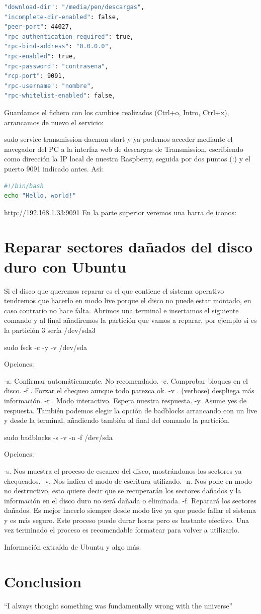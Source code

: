 \documentclass{article}
\begin{document}
\begin{lstlisting}[language=bash]
"download-dir": "/media/pen/descargas", 
"incomplete-dir-enabled": false, 
"peer-port": 44027, 
"rpc-authentication-required": true, 
"rpc-bind-address": "0.0.0.0", 
"rpc-enabled": true, 
"rpc-password": "contrasena", 
"rcp-port": 9091, 
"rpc-username": "nombre", 
"rpc-whitelist-enabled": false,
\end{lstlisting}

Guardamos el fichero con los cambios realizados (Ctrl+o, Intro, Ctrl+x), arrancamos de nuevo el servicio:

sudo service transmission-daemon start
y ya podemos acceder mediante el navegador del PC a la interfaz web de descargas de Transmission, escribiendo como dirección la IP local de nuestra Raspberry, seguida por dos puntos (:) y el puerto 9091 indicado antes. Así:

\begin{lstlisting}[language=bash,caption={bash version}]
#!/bin/bash
echo "Hello, world!"
\end{lstlisting}

http://192.168.1.33:9091
En la parte superior veremos una barra de iconos:

\section{Reparar sectores dañados del disco duro con Ubuntu}

Si el disco que queremos reparar es el que contiene el sistema operativo tendremos que hacerlo en modo live porque el disco no puede estar montado, en caso contrario no hace falta. Abrimos una terminal e insertamos el siguiente comando y al final añadiremos la partición que vamos a reparar, por ejemplo si es la partición 3 sería /dev/sda3

sudo fsck -c -y -v /dev/sda

Opciones:

-a. Confirmar automáticamente. No recomendado.
-c. Comprobar bloques en el disco.
-f . Forzar el chequeo aunque todo parezca ok.
-v . (verbose) despliega más información.
-r . Modo interactivo. Espera nuestra respuesta.
-y. Asume yes de respuesta.
También podemos elegir la opción de badblocks arrancando con un live y desde la terminal, añadiendo también al final del comando la partición.

sudo badblocks -s -v -n -f /dev/sda

Opciones:

-s. Nos muestra el proceso de escaneo del disco, mostrándonos los sectores ya chequeados.
-v. Nos indica el modo de escritura utilizado.
-n. Nos pone en modo no destructivo, esto quiere decir que se recuperarán los sectores dañados y la información en el disco duro no será dañada o eliminada.
-f. Reparará los sectores dañados.
Es mejor hacerlo siempre desde modo live ya que puede fallar el sistema y es más seguro. Este proceso puede durar horas pero es bastante efectivo. Una vez terminado el proceso es recomendable formatear para volver a utilizarlo.

Información extraída de Ubuntu y algo más.

\section{Conclusion}
``I always thought something was fundamentally wrong with the universe'' \citep{adams1995hitchhiker}



\end{document}
